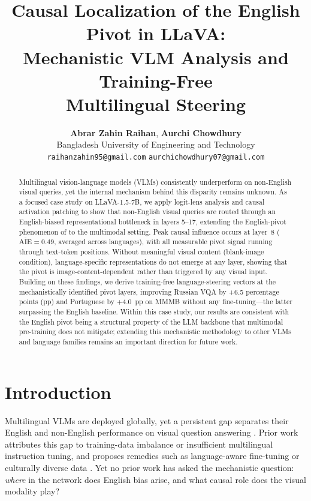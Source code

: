\documentclass[11pt]{article}
\title{Causal Localization of the English Pivot in LLaVA:\\
Mechanistic VLM Analysis and Training-Free\\
Multilingual Steering}
\author{
  \textbf{Abrar Zahin Raihan}, \textbf{Aurchi Chowdhury} \\
  Bangladesh University of Engineering and Technology \\
  \texttt{raihanzahin95@gmail.com} \quad \texttt{aurchichowdhury07@gmail.com}
}
\begin{document}
\maketitle

\begin{abstract}
Multilingual vision-language models (VLMs) consistently underperform on
non-English visual queries, yet the internal mechanism behind this disparity
remains unknown.
As a focused case study on LLaVA-1.5-7B, we apply logit-lens analysis and
causal activation patching to show that non-English visual queries are routed
through an English-biased representational bottleneck in layers 5--17,
extending the English-pivot phenomenon of \citet{wendler-etal-2024-llamas} to
the multimodal setting.
Peak causal influence occurs at layer~8 ($\overline{\mathrm{AIE}}{=}0.49$,
averaged across languages), with all measurable pivot signal running through
text-token positions.
Without meaningful visual content (blank-image condition), language-specific
representations do not emerge at any layer, showing that the pivot is
image-content-dependent rather than triggered by any visual input.
Building on these findings, we derive training-free language-steering vectors
at the mechanistically identified pivot layers, improving Russian VQA by
+6.5 percentage points (pp) and Portuguese by +4.0~pp on MMMB without any
fine-tuning---the latter surpassing the English baseline.
Within this case study, our results are consistent with the English pivot
being a structural property of the LLM backbone that multimodal pre-training
does not mitigate; extending this mechanistic methodology to other VLMs and
language families remains an important direction for future work.
\end{abstract}

\section{Introduction}

Multilingual VLMs are deployed globally, yet a persistent gap separates their
English and non-English performance on visual question answering
\citep{fan-etal-2025-plast,song-etal-2025-missing}.
Prior work attributes this gap to training-data imbalance or insufficient
multilingual instruction tuning, and proposes remedies such as language-aware
fine-tuning \citep{fan-etal-2025-plast} or culturally diverse data
\citep{nyandwi-etal-2025-grounding}.
Yet no prior work has asked the mechanistic question: \emph{where} in the
network does English bias arise, and what causal role does the visual modality
play?
\end{document}
